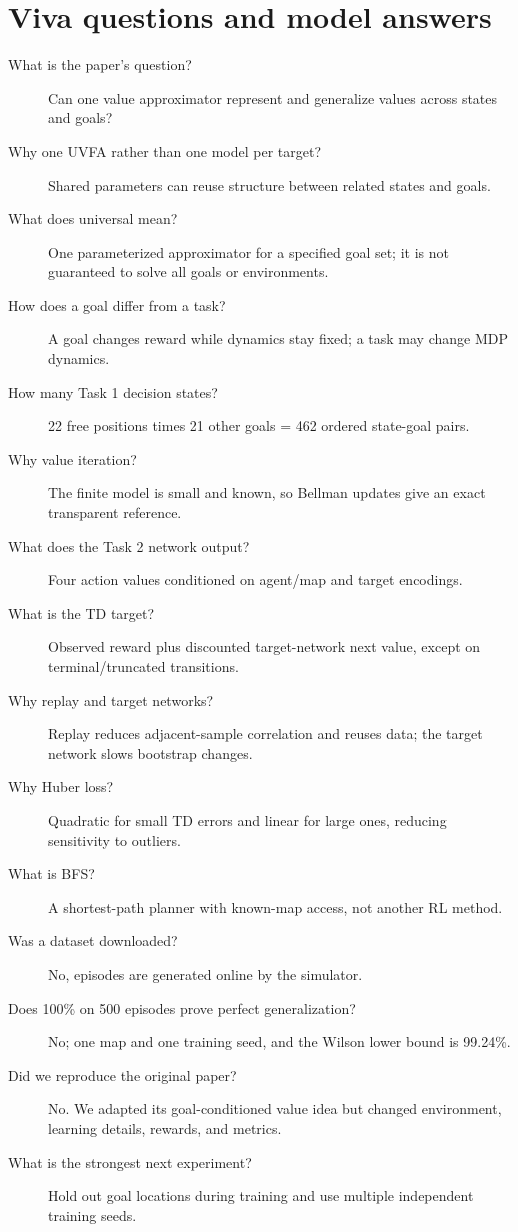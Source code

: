 \documentclass[11pt,a4paper]{article}
\begin{document}
\section{Viva questions and model answers}
\begin{description}
\item[What is the paper's question?] Can one value approximator represent and generalize values across states and goals?
\item[Why one UVFA rather than one model per target?] Shared parameters can reuse structure between related states and goals.
\item[What does universal mean?] One parameterized approximator for a specified goal set; it is not guaranteed to solve all goals or environments.
\item[How does a goal differ from a task?] A goal changes reward while dynamics stay fixed; a task may change MDP dynamics.
\item[How many Task 1 decision states?] 22 free positions times 21 other goals = 462 ordered state-goal pairs.
\item[Why value iteration?] The finite model is small and known, so Bellman updates give an exact transparent reference.
\item[What does the Task 2 network output?] Four action values conditioned on agent/map and target encodings.
\item[What is the TD target?] Observed reward plus discounted target-network next value, except on terminal/truncated transitions.
\item[Why replay and target networks?] Replay reduces adjacent-sample correlation and reuses data; the target network slows bootstrap changes.
\item[Why Huber loss?] Quadratic for small TD errors and linear for large ones, reducing sensitivity to outliers.
\item[What is BFS?] A shortest-path planner with known-map access, not another RL method.
\item[Was a dataset downloaded?] No, episodes are generated online by the simulator.
\item[Does 100\% on 500 episodes prove perfect generalization?] No; one map and one training seed, and the Wilson lower bound is 99.24\%.
\item[Did we reproduce the original paper?] No. We adapted its goal-conditioned value idea but changed environment, learning details, rewards, and metrics.
\item[What is the strongest next experiment?] Hold out goal locations during training and use multiple independent training seeds.
\end{description}
\end{document}
